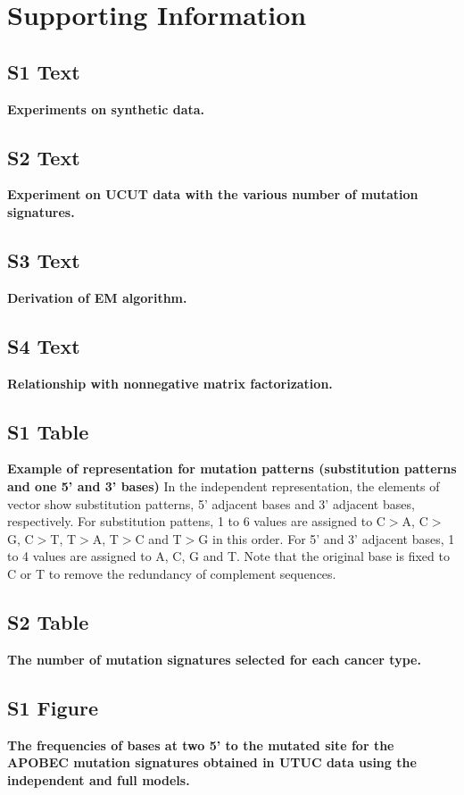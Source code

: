 \documentclass[10pt,letterpaper]{article}
\begin{document}
\section*{Supporting Information}
\subsection*{S1 Text}
\label{simulation}
{\bf Experiments on synthetic data.}

\subsection*{S2 Text}
\label{UCUT_supp}
{\bf Experiment on UCUT data with the various number of mutation signatures.}

\subsection*{S3 Text}
\label{EM_math}
{\bf Derivation of EM algorithm.}

\subsection*{S4 Text}
\label{NMF_math}
{\bf Relationship with nonnegative matrix factorization.}

\subsection*{S1 Table}
\label{mfexample}
{\bf Example of representation for mutation patterns (substitution patterns and one 5' and 3' bases)}
In the independent representation, the elements of vector show substitution patterns, 5' adjacent bases and 3' adjacent bases, respectively.
For substitution pattens, 1 to 6 values are assigned to C$>$A, C$>$G, C$>$T, T$>$A, T$>$C and T$>$G in this order.
For 5' and 3' adjacent bases, 1 to 4 values are assigned to A, C, G and T.
Note that the original base is fixed to C or T to remove the redundancy of complement sequences.

\subsection*{S2 Table}
\label{nature2013_sigNum}
{\bf The number of mutation signatures selected for each cancer type.}

\subsection*{S1 Figure}
\label{UCUT_APOBEC_twoFivePrime}
{\bf The frequencies of bases at two 5' to the mutated site for the APOBEC mutation signatures obtained in UTUC data using the independent and full models.}
\end{document}
